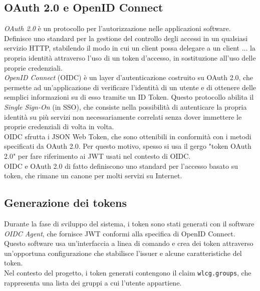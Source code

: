\subsection{OAuth 2.0 e OpenID Connect}
\textit{OAuth 2.0} è un protocollo per l'autorizzazione nelle applicazioni software. Definisce uno standard per la gestione del controllo degli accessi
in un qualsiasi servizio HTTP, stabilendo il modo in cui un client possa delegare a un client ... la propria identità attraverso l'uso di un token d'accesso, in sostituzione all'uso delle proprie credenziali. 
\\ \textit{OpenID Connect} (OIDC) è un layer d'autenticazione costruito su OAuth 2.0, che permette ad un'applicazione di 
verificare l'identità di un utente e di ottenere delle semplici informazioni su di esso tramite un ID Token. Questo protocollo abilita il \textit{Single Sign-On} (in SSO), 
che consiste nella possibilità di autenticare la propria identità su più servizi non necessariamente correlati senza dover immettere le proprie credenziali di volta in volta. 
\\OIDC sfrutta i JSON Web Token, che sono ottenibili in conformità con i metodi specificati da OAuth 2.0. Per questo motivo, spesso si usa il gergo
"token OAuth 2.0" per fare riferimento ai JWT usati nel contesto di OIDC.  
\\OIDC e OAuth 2.0 di fatto definiscono uno standard per l'accesso basato su token, che rimane un canone per molti servizi su Internet.

\subsection{Generazione dei tokens}
Durante la fase di sviluppo del sistema, i token sono stati generati con il software \textit{OIDC Agent}, che fornisce JWT conformi alla specifica di OpenID Connect.
Questo software usa un'interfaccia a linea di comando e crea dei token attraverso un'opportuna configurazione che stabilisce l'issuer e alcune caratteristiche del token.
\\ Nel contesto del progetto, i token generati contengono il claim \texttt{wlcg.groups}, che rappresenta una lista dei gruppi a cui l'utente appartiene. 

